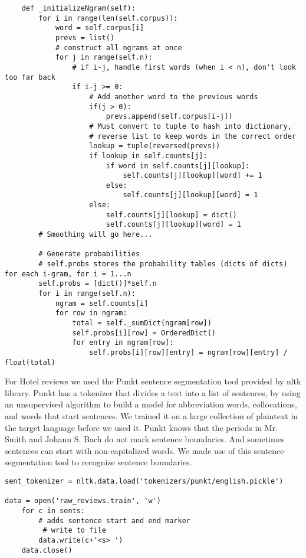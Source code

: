 \documentclass{article}
\begin{document}
{\small
\begin{verbatim}
    def _initializeNgram(self):
        for i in range(len(self.corpus)):
            word = self.corpus[i]
            prevs = list()
            # construct all ngrams at once
            for j in range(self.n):
                # if i-j, handle first words (when i < n), don't look too far back
                if i-j >= 0:
                    # Add another word to the previous words
                    if(j > 0):
                        prevs.append(self.corpus[i-j])
                    # Must convert to tuple to hash into dictionary,
                    # reverse list to keep words in the correct order
                    lookup = tuple(reversed(prevs))
                    if lookup in self.counts[j]:
                        if word in self.counts[j][lookup]:
                            self.counts[j][lookup][word] += 1
                        else:
                            self.counts[j][lookup][word] = 1
                    else:
                        self.counts[j][lookup] = dict()
                        self.counts[j][lookup][word] = 1
        # Smoothing will go here...

        # Generate probabilities
        # self.probs stores the probability tables (dicts of dicts) for each i-gram, for i = 1...n
        self.probs = [dict()]*self.n
        for i in range(self.n):
            ngram = self.counts[i]
            for row in ngram:
                total = self._sumDict(ngram[row])
                self.probs[i][row] = OrderedDict()
                for entry in ngram[row]:
                    self.probs[i][row][entry] = ngram[row][entry] / float(total)
\end{verbatim}}

\newpage
For Hotel reviews we used the Punkt sentence segmentation tool provided by nltk library. Punkt has a tokenizer that divides a text into a list of sentences, by using an unsupervised algorithm to build a model for abbreviation words, collocations, and words that start sentences. We trained it on a large collection of plaintext in the target language before we used it. Punkt knows that the periods in Mr. Smith and Johann S. Bach do not mark sentence boundaries. And sometimes sentences can start with non-capitalized words. We made use of this sentence segmentation tool to recognize sentence boundaries. 

{\small
\begin{verbatim}
sent_tokenizer = nltk.data.load('tokenizers/punkt/english.pickle')

data = open('raw_reviews.train', 'w')
    for c in sents:
        # adds sentence start and end marker
         # write to file
        data.write(c+'<s> ')
    data.close()
\end{verbatim}
}
\end{document}
